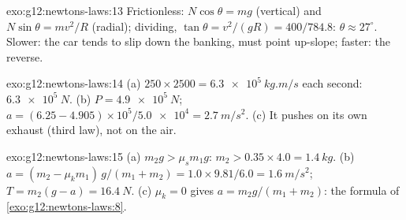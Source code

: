 \begin{solution}{exo:g12:newtons-laws:13}
Frictionless: $N\cos\theta = mg$ (vertical) and $N\sin\theta =
mv^2/R$ (radial); dividing, $\tan\theta = v^2/(gR) = 400/784.8$:
$\theta \approx 27^\circ$. Slower: the car tends to slip down the
banking,  must point up-slope; faster: the reverse.
\end{solution}

\begin{solution}{exo:g12:newtons-laws:14}
(a) $250 \times 2500 = \qty{6.3e5}{kg.m/s}$ each second: 
$\qty{6.3e5}{N}$. (b) $P = \qty{4.9e5}{N}$;
$a = (6.25 - 4.905) \times 10^5 / \num{5.0e4} = \qty{2.7}{m/s^2}$.
(c) It pushes on its own exhaust (third law), not on the air.
\end{solution}

\begin{solution}{exo:g12:newtons-laws:15}
(a) $m_2 g > \mu_s m_1 g$: $m_2 > 0.35 \times 4.0 = \qty{1.4}{kg}$.
(b) $a = (m_2 - \mu_k m_1)\,g/(m_1 + m_2) = 1.0 \times 9.81/6.0 =
\qty{1.6}{m/s^2}$; $T = m_2(g - a) = \qty{16.4}{N}$.
(c) $\mu_k = 0$ gives $a = m_2 g/(m_1 + m_2)$: the formula of
\cref{exo:g12:newtons-laws:8}.
\end{solution}

